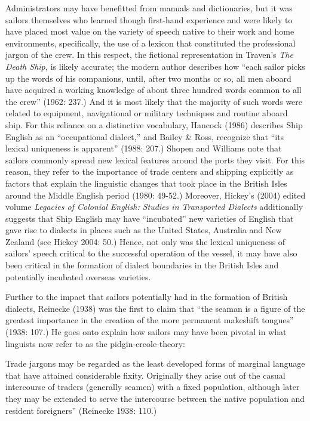 \begin{styleStandard}
Administrators may have benefitted from manuals and dictionaries, but it was sailors themselves who learned though first-hand experience and were likely to have placed most value on the variety of speech native to their work and home environments, specifically, the use of a lexicon that constituted the professional jargon of the crew. In this respect, the fictional representation in Traven’s \textit{The Death Ship, }is likely accurate; the modern author describes how “each sailor picks up the words of his companions, until, after two months or so, all men aboard have acquired a working knowledge of about three hundred words common to all the crew” (1962: 237.) And it is most likely that the majority of such words were related to equipment, navigational or military techniques and routine aboard ship. For this reliance on a distinctive vocabulary, Hancock (1986) describes Ship English as an “occupational dialect,” and Bailey \& Ross, recognize that “its lexical uniqueness is apparent” (1988: 207.) Shopen and Williams note that sailors commonly spread new lexical features around the ports they visit. For this reason, they refer to the importance of trade centers and shipping explicitly as factors that explain the linguistic changes that took place in the British Isles around the Middle English period (1980: 49-52.) Moreover, Hickey’s (2004) edited volume \textit{Legacies of Colonial English: Studies in Transported Dialects} additionally suggests that Ship English may have “incubated” new varieties of English that gave rise to dialects in places such as the United States, Australia and New Zealand (see Hickey 2004: 50.) Hence, not only was the lexical uniqueness of sailors’ speech critical to the successful operation of the vessel, it may have also been critical in the formation of dialect boundaries in the British Isles and potentially incubated overseas varieties.
\end{styleStandard}

\begin{styleStandard}
Further to the impact that sailors potentially had in the formation of British dialects, Reinecke (1938) was the first to claim that “the seaman is a figure of the greatest importance in the creation of the more permanent makeshift tongues” (1938: 107.) He goes onto explain how sailors may have been pivotal in what linguists now refer to as the pidgin-creole theory:
\end{styleStandard}

\begin{styleStandard}
Trade jargons may be regarded as the least developed forms of marginal language that have attained considerable fixity. Originally they arise out of the casual intercourse of traders (generally seamen) with a fixed population, although later they may be extended to serve the intercourse between the native population and resident foreigners” (Reinecke 1938: 110.) 
\end{styleStandard}

